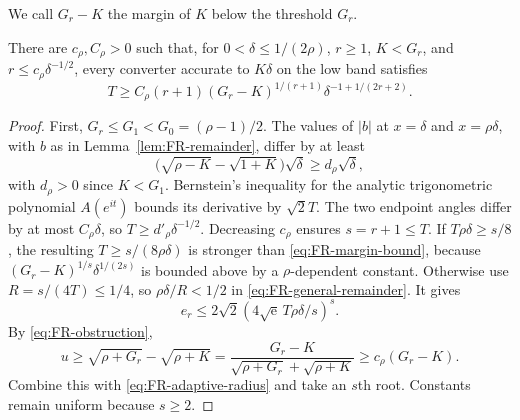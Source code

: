 We call $G_r-K$ the margin of $K$ below the threshold $G_r$.
\begin{theorem}\label{thm:FR-margin}
There are $c_\rho,C_\rho>0$ such that, for $0<\delta\leq1/(2\rho)$, $r\geq1$, $K<G_r$, and $r\leq c_\rho\delta^{-1/2}$, every converter accurate to $K\delta$ on the low band satisfies
\begin{equation}\label{eq:FR-margin-bound}
 T\geq C_\rho(r+1)(G_r-K)^{1/(r+1)}
                  \delta^{-1+1/(2r+2)}.
\end{equation}
\end{theorem}
\begin{proof}
First, $G_r\leq G_1<G_0=(\rho-1)/2$. The values of $|b|$ at $x=\delta$ and $x=\rho\delta$, with $b$ as in Lemma~\ref{lem:FR-remainder}, differ by at least
\[
 \bigl(\sqrt{\rho-K}-\sqrt{1+K}\bigr)\sqrt\delta
 \geq d_\rho\sqrt\delta,
\]
with $d_\rho>0$ since $K<G_1$. Bernstein's inequality for the analytic trigonometric polynomial $A(e^{it})$ bounds its derivative by $\sqrt2T$. The two endpoint angles differ by at most $C_\rho\delta$, so $T\geq d'_\rho\delta^{-1/2}$. Decreasing $c_\rho$ ensures $s=r+1\leq T$.
If $T\rho\delta\geq s/8$, the resulting $T\geq s/(8\rho\delta)$ is stronger than \eqref{eq:FR-margin-bound}, because $(G_r-K)^{1/s}\delta^{1/(2s)}$ is bounded above by a $\rho$-dependent constant. Otherwise use $R=s/(4T)\leq1/4$, so $\rho\delta/R<1/2$ in \eqref{eq:FR-general-remainder}. It gives
\begin{equation}\label{eq:FR-adaptive-radius}
 e_r\leq2\sqrt2\left(4\sqrt{\mathrm e}\,T\rho\delta/s\right)^s.
\end{equation}
By \eqref{eq:FR-obstruction},
\[
 u\geq\sqrt{\rho+G_r}-\sqrt{\rho+K}
 =\frac{G_r-K}{\sqrt{\rho+G_r}+\sqrt{\rho+K}}
 \geq c_\rho(G_r-K).
\]
Combine this with \eqref{eq:FR-adaptive-radius} and take an $s$th root. Constants remain uniform because $s\geq2$.
\end{proof}

